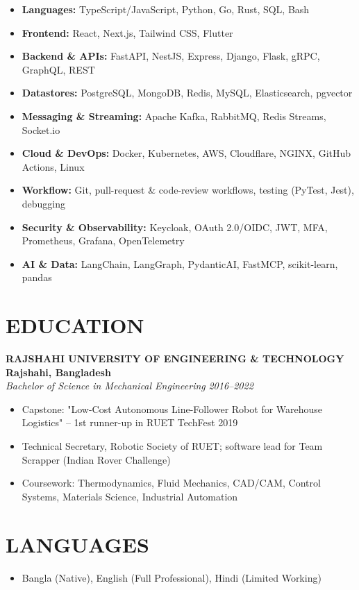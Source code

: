 \documentclass[11pt,letterpaper]{article}
\newcommand{\role}[4]{
  \begin{center}
  \textbf{#1} \hfill \textbf{#2} \\
  \textit{#3} \hfill \textit{#4}
  \end{center}
}
\begin{document}
\vspace{0.5em}
\begin{itemize}[leftmargin=*,nosep]
  \item \textbf{Languages:} TypeScript/JavaScript, Python, Go, Rust, SQL, Bash
  \item \textbf{Frontend:} React, Next.js, Tailwind CSS, Flutter
  \item \textbf{Backend \& APIs:} FastAPI, NestJS, Express, Django, Flask, gRPC, GraphQL, REST
  \item \textbf{Datastores:} PostgreSQL, MongoDB, Redis, MySQL, Elasticsearch, pgvector
  \item \textbf{Messaging \& Streaming:} Apache Kafka, RabbitMQ, Redis Streams, Socket.io
  \item \textbf{Cloud \& DevOps:} Docker, Kubernetes, AWS, Cloudflare, NGINX, GitHub Actions, Linux
  \item \textbf{Workflow:} Git, pull-request \& code-review workflows, testing (PyTest, Jest), debugging
  \item \textbf{Security \& Observability:} Keycloak, OAuth 2.0/OIDC, JWT, MFA, Prometheus, Grafana, OpenTelemetry
  \item \textbf{AI \& Data:} LangChain, LangGraph, PydanticAI, FastMCP, scikit-learn, pandas
\end{itemize}

\vspace{1em}
\section{EDUCATION}

\vspace{0.5em}
\role{RAJSHAHI UNIVERSITY OF ENGINEERING \& TECHNOLOGY}{Rajshahi, Bangladesh}{Bachelor of Science in Mechanical Engineering}{2016--2022}
\begin{itemize}[leftmargin=*,nosep,topsep=0pt]
  \item Capstone: "Low-Cost Autonomous Line-Follower Robot for Warehouse Logistics" -- 1st runner-up in RUET TechFest 2019
  \item Technical Secretary, Robotic Society of RUET; software lead for Team Scrapper (Indian Rover Challenge)
  \item Coursework: Thermodynamics, Fluid Mechanics, CAD/CAM, Control Systems, Materials Science, Industrial Automation
\end{itemize}

\vspace{1em}
\section{LANGUAGES}

\vspace{0.5em}
\begin{itemize}[leftmargin=*,nosep]
  \item Bangla (Native), English (Full Professional), Hindi (Limited Working)
\end{itemize}
\end{document}
